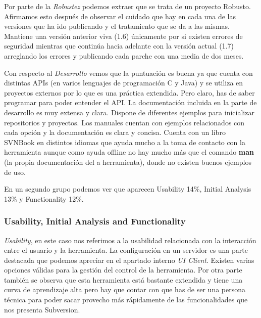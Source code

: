\documentclass[11pt]{scrartcl}
\begin{document}
\par Por parte de la \emph{Robustez} podemos extraer que se trata de un proyecto Robusto. Afirmamos esto despu\'es de observar el cuidado que hay en cada una de las versiones que ha ido publicando y el tratamiento que se da a las mismas. Mantiene una versi\'on anterior viva (1.6) \'unicamente por si existen errores de seguridad mientras que contin\'ua hacia adelante con la versi\'on actual (1.7) arreglando los errores y publicando cada parche con una media de dos meses.

\par Con respecto al \emph{Desarrollo} vemos que la puntuaci\'on es buena ya que cuenta con distintas APIs (en varios lenguajes de programaci\'on C y Java) y se utiliza en proyectos externos por lo que es una pr\'actica extendida. Pero claro, has de saber programar para poder entender el API.
La documentaci\'on incluida en la parte de desarrollo es muy extensa y clara. Dispone de diferentes ejemplos para inicializar repositorios y proyectos. Los manuales cuentan con ejemplos relacionados con cada opci\'on y la documentaci\'on es clara y concisa. Cuenta con un libro SVNBook en distintos idiomas que ayuda mucho a la toma de contacto con la herramienta aunque como ayuda offline no hay mucho m\'as que el comando \textbf{man} (la propia documentaci\'on del a herramienta), donde no existen buenos ejemplos de uso.

\par En un segundo grupo podemos ver que aparecen Usability 14\%, Initial Analysis 13\% y Functionality 12\%.

\subsubsection{Usability, Initial Analysis and Functionality}

\par \emph{Usability}, en este caso nos referimos a la usabilidad relacionada con la interacci\'on entre el usuario y la herramienta. La configuraci\'on en un servidor es una parte destacada que podemos apreciar en el apartado interno \emph{UI Client}. Existen varias opciones v\'alidas para la gesti\'on del control de la herramienta. Por otra parte tambi\'en se observa que esta herramienta est\'a bastante extendida y tiene una curva de aprendizaje alta pero hay que contar con que has de ser una persona t\'ecnica para poder sacar provecho m\'as r\'apidamente de las funcionalidades que nos presenta Subversion.
\end{document}
